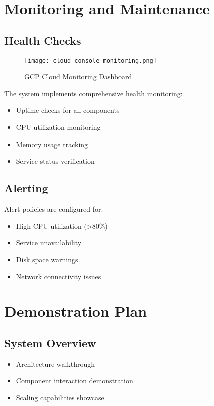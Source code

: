 \documentclass[12pt,a4paper]{report}
\begin{document}
\section{Monitoring and Maintenance}

\subsection{Health Checks}
\begin{figure}[htb!]
    \centering
    \texttt{[image: cloud\_console\_monitoring.png]}
    \caption{GCP Cloud Monitoring Dashboard}
    \label{fig:monitoring-console}
\end{figure}

The system implements comprehensive health monitoring:
\begin{itemize}
\item Uptime checks for all components
\item CPU utilization monitoring
\item Memory usage tracking
\item Service status verification
\end{itemize}

\subsection{Alerting}
Alert policies are configured for:
\begin{itemize}
\item High CPU utilization (>80\%)
\item Service unavailability
\item Disk space warnings
\item Network connectivity issues
\end{itemize}

\section{Demonstration Plan}

\subsection{System Overview}
\begin{itemize}
\item Architecture walkthrough
\item Component interaction demonstration
\item Scaling capabilities showcase
\end{itemize}
\end{document}
